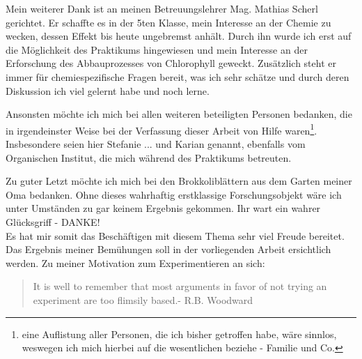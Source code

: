 Mein weiterer Dank ist an meinen Betreuungslehrer Mag. Mathias Scherl gerichtet. Er schaffte es in der 5ten Klasse, mein Interesse an der Chemie zu wecken, dessen Effekt bis heute ungebremst anhält. Durch ihn wurde ich erst auf die Möglichkeit des Praktikums hingewiesen und mein Interesse an der Erforschung des Abbauprozesses von Chlorophyll geweckt. Zusätzlich steht er immer für chemiespezifische Fragen bereit, was ich sehr schätze und durch deren Diskussion ich viel gelernt habe und noch lerne. 

Ansonsten möchte ich mich bei allen weiteren beteiligten Personen bedanken, die in irgendeinster Weise bei der Verfassung dieser Arbeit von Hilfe waren\footnote{eine Auflistung aller Personen, die ich bisher getroffen habe, wäre sinnlos, weswegen ich mich hierbei auf die wesentlichen beziehe - Familie und Co.}. Insbesondere seien hier Stefanie ... und Karian genannt, ebenfalls vom Organischen Institut, die mich während des Praktikums betreuten.  

Zu guter Letzt möchte ich mich bei den Brokkoliblättern aus dem Garten meiner Oma bedanken. Ohne dieses wahrhaftig erstklassige Forschungsobjekt wäre ich unter Umständen zu gar keinem Ergebnis gekommen. Ihr wart ein wahrer Glücksgriff - DANKE! \\

Es hat mir somit das Beschäftigen mit diesem Thema sehr viel Freude bereitet. Das Ergebnis meiner Bemühungen soll in der vorliegenden Arbeit ersichtlich werden. Zu meiner Motivation zum Experimentieren an sich: \\

\begin{quotation}
 \glqq It is well to remember that most arguments in favor of not trying an experiment are too flimsily based.\grqq - R.B. Woodward
 \end{quotation} 

